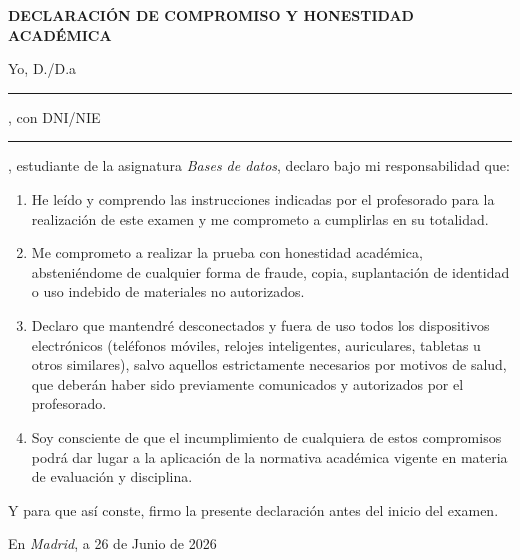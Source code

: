 \documentclass[10pt,a4paper,addpoints,answers]{exam}
\begin{document}
\vspace{1em}

\begin{center}\textbf{DECLARACIÓN DE COMPROMISO Y HONESTIDAD ACADÉMICA}\end{center}

Yo, D./D.a \rule{7cm}{0.4pt}, con DNI/NIE \rule{3cm}{0.4pt}, estudiante de la asignatura \textit{Bases de datos}, declaro bajo mi responsabilidad que:

\begin{enumerate}
    \item He leído y comprendo las instrucciones indicadas por el profesorado para la realización de este examen y me comprometo a cumplirlas en su totalidad.
    \item Me comprometo a realizar la prueba con honestidad académica, absteniéndome de cualquier forma de fraude, copia, suplantación de identidad o uso indebido de materiales no autorizados.
    \item Declaro que mantendré desconectados y fuera de uso todos los dispositivos electrónicos (teléfonos móviles, relojes inteligentes, auriculares, tabletas u otros similares), salvo aquellos estrictamente necesarios por motivos de salud, que deberán haber sido previamente comunicados y autorizados por el profesorado.
    \item Soy consciente de que el incumplimiento de cualquiera de estos compromisos podrá dar lugar a la aplicación de la normativa académica vigente en materia de evaluación y disciplina. 
\end{enumerate}

Y para que así conste, firmo la presente declaración antes del inicio del examen.

\vspace{3em}

\begin{center}En \textit{Madrid}, a 26 de Junio de 2026\end{center}

\newpage
\end{document}

